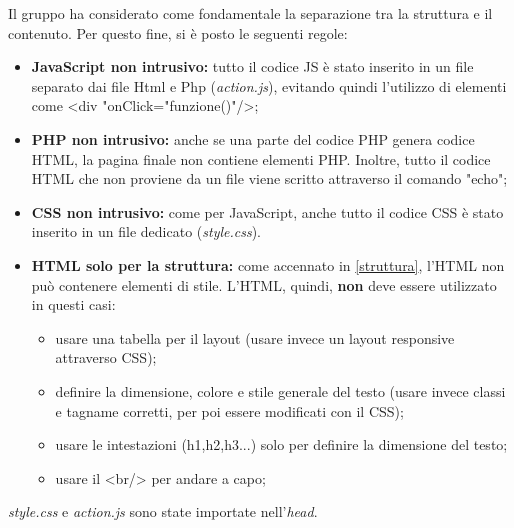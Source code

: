 Il gruppo ha considerato come fondamentale la separazione tra la struttura e il contenuto. Per questo fine, si è posto le seguenti regole:
\begin{itemize}
    \item \textbf{JavaScript non intrusivo:} tutto il codice JS è stato inserito in un file separato dai file Html e Php (\textit{action.js}), evitando quindi l'utilizzo di elementi come <div "onClick="funzione()"/>;
    \item \textbf{PHP non intrusivo:} anche se una parte del codice PHP genera codice HTML, la pagina finale non contiene elementi PHP. Inoltre, tutto il codice HTML che non proviene da un file viene scritto attraverso il comando "echo";
    \item \textbf{CSS non intrusivo:} come per JavaScript, anche tutto il codice CSS è stato inserito in un file dedicato (\textit{style.css}).
    \item \textbf{HTML solo per la struttura:} come accennato in \ref{struttura}, l'HTML non può contenere elementi di stile. L'HTML, quindi, \textbf{non} deve essere utilizzato in questi casi:
        \begin{itemize}
            \item usare una tabella per il layout (usare invece un layout responsive attraverso CSS);
            \item definire la dimensione, colore e stile generale del testo (usare invece classi e tagname corretti, per poi essere modificati con il CSS);
            \item usare le intestazioni (h1,h2,h3...) solo per definire la dimensione del testo;
            \item usare il <br/> per andare a capo;
        \end{itemize} 
\end{itemize} 
\textit{style.css} e \textit{action.js} sono state importate nell'\textit{head}.